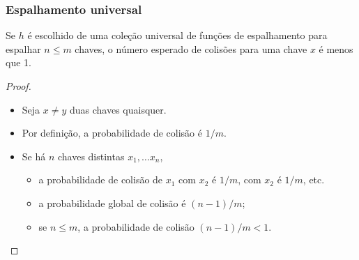\documentclass{beamer}
\begin{document}
\begin{frame}

  \frametitle{Espalhamento universal}

  \begin{theorem}

    Se $h$ é escolhido de uma coleção universal de funções de espalhamento
    para espalhar $n \le m$ chaves, o número esperado de colisões para
    uma chave $x$ é menos que 1.

  \end{theorem}

  \begin{proof}

    \begin{itemize}

    \item Seja $x \neq y$ duas chaves quaisquer.

    \item Por definição, a probabilidade de colisão é $1 / m$.

    \item Se há $n$ chaves distintas $x_1, \ldots x_n$, 

      \begin{itemize}

        \item a probabilidade de colisão de 
          $x_1$ com $x_2$ é $1 / m$, com $x_2$ é $1 / m$, etc.

        \item a probabilidade global de colisão é $(n-1)/m$;

        \item se $n \le m$, a probabilidade de colisão  $(n-1)/m < 1$.

      \end{itemize}

    \end{itemize}

  \end{proof}

\end{frame}
\end{document}
